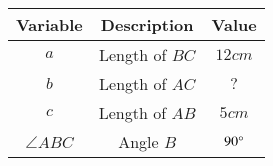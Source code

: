 \begin{center}
    \begin{tabular}{|c|c|c|} 
        \hline
            \textbf{Variable} & \textbf{Description} & \textbf{Value} \\ 
        \hline
            ${a}$    & Length of $BC$ & $12cm$ \\ 
        \hline
            ${b}$    & Length of $AC$ & $?$\\ 
        \hline
            ${c}$    & Length of $AB$ & $5cm$\\
            \hline
            $\angle{ABC}$& Angle $B$      & $90\degree$\\
        \hline
    \end{tabular}
\end{center}
